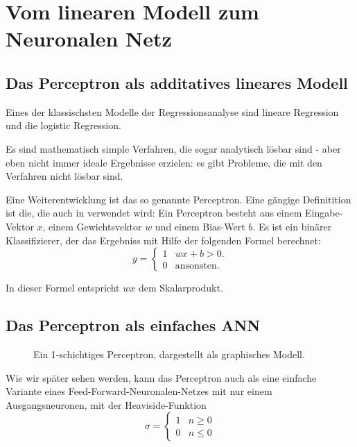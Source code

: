 ﻿\section{Vom linearen Modell zum Neuronalen Netz}

\subsection{Das Perceptron als additatives lineares Modell}
Eines der klassischsten Modelle der Regressionsanalyse sind lineare Regression und die logistic Regression. 

Es sind mathematisch simple Verfahren, die sogar analytisch lösbar sind - aber eben nicht immer ideale Ergebnisse erzielen: es gibt Probleme, die mit den Verfahren nicht lösbar sind. 

Eine Weiterentwicklung ist das so genannte Perceptron.
Eine gängige Definitition ist die, die auch in \cite{bishop1995neural} verwendet wird: 
Ein Perceptron besteht aus einem Eingabe-Vektor $x$, einem Gewichtsvektor $w$ und einem Bias-Wert $b$. Es ist ein binärer Klassifizierer, der das Ergebniss mit Hilfe der folgenden Formel berechnet:
\begin{equation}
\label{eq:perceptron}
    y = \begin{cases}
               1               & w x + b > 0.\\
               0               & \text{ansonsten}. %
           \end{cases} 
\end{equation}

In dieser Formel entspricht $wx$ dem Skalarprodukt.

\subsection{Das Perceptron als einfaches ANN}
\begin{figure}[ht!]
  \label{fig:SLP}
  \centering
    
  \caption{Ein 1-schichtiges Perceptron, dargestellt als graphisches Modell.}
\end{figure}

Wie wir später sehen werden, kann das Perceptron auch als eine einfache Variante eines Feed-Forward-Neuronalen-Netzes mit nur einem Ausgangsneuronen, mit der Heaviside-Funktion
\begin{equation}
    \sigma = \begin{cases}
               1               & n \geq 0\\
               0               & n \leq 0
           \end{cases}
\end{equation}

